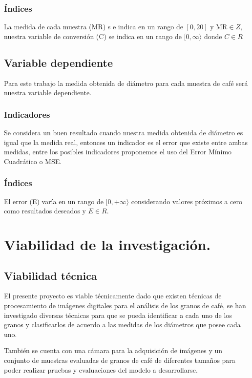 \subsubsection{Índices}
La medida de cada muestra (MR) s	e indica en un rango de $[0,20]$ y $\text{MR} \in Z$, nuestra variable de conversión (C) se indica en un rango de $[0, \infty \rangle$ donde $C \in R$

\subsection{Variable dependiente}
Para este trabajo la medida obtenida de diámetro para cada muestra de café será nuestra variable dependiente.

\subsubsection{Indicadores}
Se considera un buen resultado cuando nuestra medida obtenida de diámetro es igual que la medida real, entonces un indicador es el error que existe entre ambas medidas, entre los posibles indicadores proponemos el uso del Error Mínimo Cuadrático o MSE.

\subsubsection{Índices}
El error (E) varía en un rango de $[0,+\infty\rangle$ considerando valores próximos a cero como resultados deseados y $E \in R$.


\section{Viabilidad de la investigación.}

\subsection{Viabilidad técnica}
El presente proyecto es viable técnicamente dado que existen técnicas de procesamiento de imágenes digitales para el análisis de los granos de café, se han investigado diversas técnicas para que se pueda identificar a cada uno de los granos y clasificarlos de acuerdo a las medidas de los diámetros que posee cada uno.

También se cuenta con una cámara para la adquisición de imágenes y un conjunto de muestras evaluadas de granos de café de diferentes tamaños para poder realizar pruebas y evaluaciones del modelo a desarrollarse.

